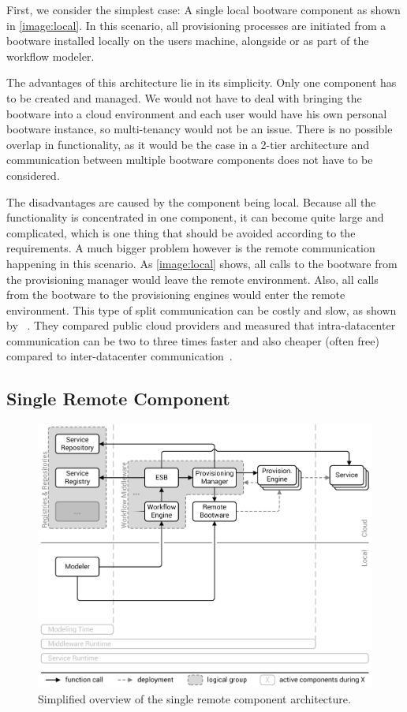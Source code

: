 First, we consider the simplest case: A single local bootware component as shown in \autoref{image:local}.
In this scenario, all provisioning processes are initiated from a bootware installed locally on the users machine, alongside or as part of the workflow modeler.

The advantages of this architecture lie in its simplicity.
Only one component has to be created and managed.
We would not have to deal with bringing the bootware into a cloud environment and each user would have his own personal bootware instance, so multi-tenancy would not be an issue.
There is no possible overlap in functionality, as it would be the case in a 2-tier architecture and communication between multiple bootware components does not have to be considered.

The disadvantages are caused by the component being local.
Because all the functionality is concentrated in one component, it can become quite large and complicated, which is one thing that should be avoided according to the requirements.
A much bigger problem however is the remote communication happening in this scenario.
As \autoref{image:local} shows, all calls to the bootware from the provisioning manager would leave the remote environment.
Also, all calls from the bootware to the provisioning engines would enter the remote environment.
This type of split communication can be costly and slow, as shown by \citeauthor*{cloudcmp}~\autocite{cloudcmp}.
They compared public cloud providers and measured that intra-datacenter communication can be two to three times faster and also cheaper (often free) compared to inter-datacenter communication~\autocite{cloudcmp}.

\subsection{Single Remote Component}

\begin{figure}[!htbp]
	\centering
	\includegraphics[resolution=600]{design/assets/remote}
	\caption{Simplified overview of the single remote component architecture.}
	\label{image:remote}
\end{figure}

